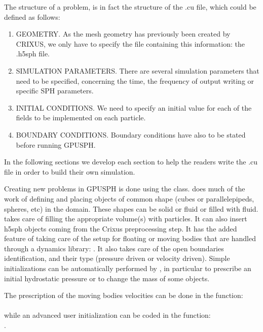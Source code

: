 \documentclass{../GPUSPHtemplate}
\begin{document}
The structure of a problem, is in fact the structure of the .cu file, 
which could be defined as follows:
\begin{enumerate}
\item GEOMETRY. As the mesh geometry has previously been 
created by CRIXUS, we only have to specify the file 
containing this information: the .h5sph file.
\item SIMULATION PARAMETERS. There are several simulation 
parameters that need to be specified, concerning the time, 
the frequency of output writing or specific SPH parameters.
\item INITIAL CONDITIONS. We need to specify an initial 
value for each of the fields to be implemented on each particle.
\item BOUNDARY CONDITIONS. Boundary conditions 
have also to be stated before running GPUSPH.
\end{enumerate}
In the following sections we develop each section to help 
the readers write the .cu file in order to build their own simulation.


Creating new problems in GPUSPH is done using the  class.
 does much of the work of defining and placing objects of common shape 
(cubes or parallelepipeds, spheres, etc)  in the domain. 
These shapes can be solid or fluid or filled with fluid.  
 takes care of filling the appropriate volume(s) with particles.   
It can also insert h5sph objects coming
from the Crixus preprocessing step. 
It has the added feature of taking care of the setup for floating or moving 
bodies that are handled through a dynamics library:  .  
It also takes care of the open boundaries identification, and their type (pressure driven or velocity driven).
Simple initializations can be automatically performed by , in particular to prescribe an initial
hydrostatic pressure or to change the mass of some objects.

The prescription of the moving bodies velocities can be done in the function:\\
\\
while an advanced user initialization can be coded in the function:\\
.
\end{document}
